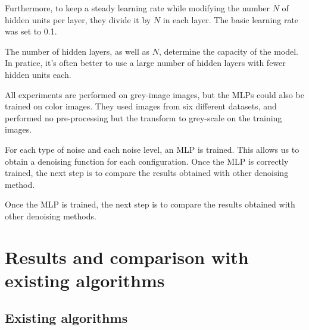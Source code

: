\documentclass[10pt,a4paper]{article}
\newcommand{\svs}{\vspace{9pt}}
\begin{document}
\svs

Furthermore, to keep a steady learning rate while modifying the number $N$ of hidden units per layer, they divide it by $N$ in each layer. The basic learning rate was set to 0.1. 

\svs

The number of hidden layers, as well as $N$, determine the capacity of the model. In pratice, it's often better to use a large number of hidden layers with fewer hidden units each.

\svs

All experiments are performed on grey-image images, but the MLPs could also be trained on color images. They used images from six different datasets, and performed no pre-processing but the transform to grey-scale on the training images. 

\svs 

For each type of noise and each noise level, an MLP is trained. This allows us to obtain a
denoising function for each configuration.
Once the MLP is correctly trained, the next step is to compare the results obtained with other
denoising method.

Once the MLP is trained, the next step is to compare the results obtained with other denoising methods.





\svs

\section{Results and comparison with existing algorithms}



\subsection{Existing algorithms}
\end{document}
